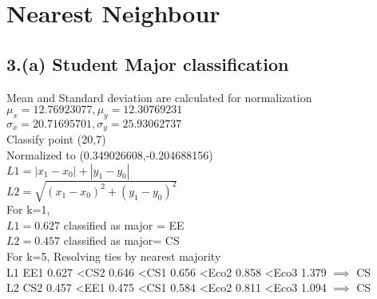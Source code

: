 \documentclass[10pt,letterpaper]{article}
\begin{document}
\section{Nearest Neighbour}
\subsection{3.(a) Student Major classification}

Mean and Standard deviation are calculated for normalization \\
$\mu_x = 12.76923077 , \mu_y=	12.30769231$\\
$\sigma_x=20.71695701,\sigma_y= 	25.93062737$\\
Classify point (20,7) \\
Normalized to (0.349026608,-0.204688156)\\

$L1 = |x_1-x_0| +  |y_1-y_0|$\\
$L2 = \sqrt{(x_1-x_0)^2 + (y_1-y_0)^2}$\\

For k=1,\\  
$ L1=0.627$	 classified as major = EE\\
$L2=0.457$  classified as major= CS   \\ 

For k=5,  Resolving ties  by nearest majority\\
L1 EE1	0.627 \textless CS2	0.646 \textless CS1	0.656  \textless Eco2	0.858 \textless Eco3	1.379 $\implies$ CS \\
L2 CS2	0.457  \textless  EE1	0.475 \textless  CS1	0.584 \textless Eco2	0.811 \textless Eco3	1.094 $\implies$ CS\\
\end{document}
